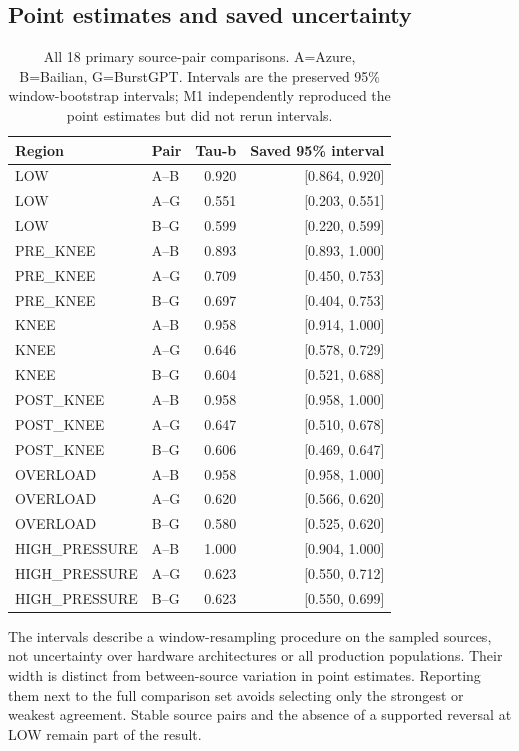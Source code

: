 \subsection{Point estimates and saved uncertainty}
\begin{table}[t]\centering
\caption{All 18 primary source-pair comparisons. A=Azure, B=Bailian,
G=BurstGPT. Intervals are the preserved 95\% window-bootstrap intervals;
M1 independently reproduced the point estimates but did not rerun intervals.}
\label{tab:all-correlations}
\begin{tabular}{llrr}\toprule
Region & Pair & Tau-b & Saved 95\% interval\\\midrule
LOW & A--B & 0.920 & [0.864, 0.920]\\
LOW & A--G & 0.551 & [0.203, 0.551]\\
LOW & B--G & 0.599 & [0.220, 0.599]\\
PRE\_KNEE & A--B & 0.893 & [0.893, 1.000]\\
PRE\_KNEE & A--G & 0.709 & [0.450, 0.753]\\
PRE\_KNEE & B--G & 0.697 & [0.404, 0.753]\\
KNEE & A--B & 0.958 & [0.914, 1.000]\\
KNEE & A--G & 0.646 & [0.578, 0.729]\\
KNEE & B--G & 0.604 & [0.521, 0.688]\\
POST\_KNEE & A--B & 0.958 & [0.958, 1.000]\\
POST\_KNEE & A--G & 0.647 & [0.510, 0.678]\\
POST\_KNEE & B--G & 0.606 & [0.469, 0.647]\\
OVERLOAD & A--B & 0.958 & [0.958, 1.000]\\
OVERLOAD & A--G & 0.620 & [0.566, 0.620]\\
OVERLOAD & B--G & 0.580 & [0.525, 0.620]\\
HIGH\_PRESSURE & A--B & 1.000 & [0.904, 1.000]\\
HIGH\_PRESSURE & A--G & 0.623 & [0.550, 0.712]\\
HIGH\_PRESSURE & B--G & 0.623 & [0.550, 0.699]\\
\bottomrule\end{tabular}\end{table}
The intervals describe a window-resampling procedure on the sampled
sources, not uncertainty over hardware architectures or all production
populations. Their width is distinct from between-source variation in
point estimates. Reporting them next to the full comparison set avoids
selecting only the strongest or weakest agreement. Stable source pairs
and the absence of a supported reversal at LOW remain part of the result.
